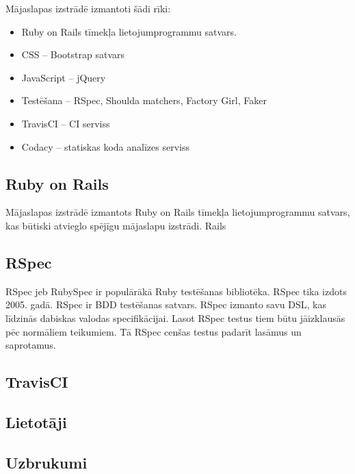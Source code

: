 Mājaslapas izstrādē izmantoti šādi rīki:
\begin{itemize}
	\item Ruby on Rails tīmekļa lietojumprogrammu satvars.
	\item CSS -- Bootstrap satvars
	\item JavaScript -- jQuery
	\item Testēšana -- RSpec, Shoulda matchers, Factory Girl, Faker
	\item TravisCI -- CI serviss
	\item Codacy -- statiskas koda analīzes serviss
\end{itemize}

\subsection{Ruby on Rails}
Mājaslapas izstrādē izmantots Ruby on Rails tīmekļa lietojumprogrammu satvars, kas būtiski atvieglo spējīgu mājaslapu izstrādi. Rails


\subsection{RSpec}
RSpec jeb RubySpec ir populārākā Ruby testēšanas bibliotēka. RSpec tika izdots 2005. gadā.
\cite{shayRspec}
RSpec ir BDD testēšanas satvars. RSpec izmanto savu DSL, kas līdzinās dabiskas valodas specifikācijai. Lasot RSpec testus tiem būtu jāizklausās pēc normāliem teikumiem. Tā RSpec cenšas testus padarīt lasāmus un saprotamus.

\subsection{TravisCI}

\subsection{Lietotāji}
\subsection{Uzbrukumi}